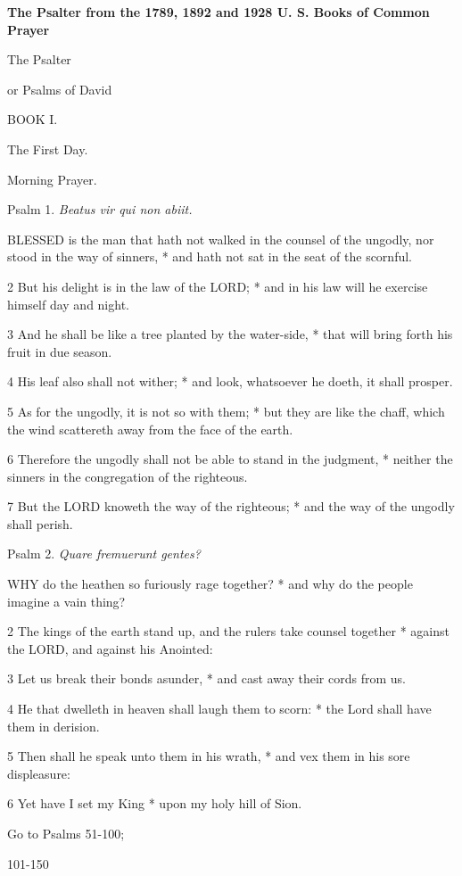 
\textbf{The Psalter from the 1789, 1892 and 1928 U. S. Books of Common
Prayer}

The
Psalter 

or Psalms of David

BOOK
I.

The
First Day.

Morning
Prayer.

Psalm
1. \emph{Beatus vir qui non abiit.}

BLESSED
is the man that hath not walked in the counsel of the ungodly, nor stood
in the way of sinners, * and hath not sat in the seat of the scornful.

2 But his delight is in the law of the LORD;
* and in his law will he exercise himself day and night.

3 And he shall be like a tree planted by the water-side,
* that will bring forth his fruit in due season.

4 His leaf also shall not wither; * and look, whatsoever
he doeth, it shall prosper.

5 As for the ungodly, it is not so with them; * but
they are like the chaff, which the wind scattereth away from the face
of the earth.

6 Therefore the ungodly shall not be able to stand
in the judgment, * neither the sinners in the congregation of the righteous.

7 But the LORD knoweth the way
of the righteous; * and the way of the ungodly shall perish.

Psalm
2. \emph{Quare fremuerunt gentes?}

WHY
do the heathen so furiously rage together? * and why do the people imagine
a vain thing?

2 The kings of the earth stand up, and the rulers take
counsel together * against the LORD, and against
his Anointed:

3 Let us break their bonds asunder, * and cast away
their cords from us.

4 He that dwelleth in heaven shall laugh them to scorn:
* the Lord shall have them in derision.

5 Then shall he speak unto them in his wrath, * and
vex them in his sore displeasure:

6 Yet have I set my King * upon my holy hill of Sion.

Go
to Psalms 51-100; 

101-150

